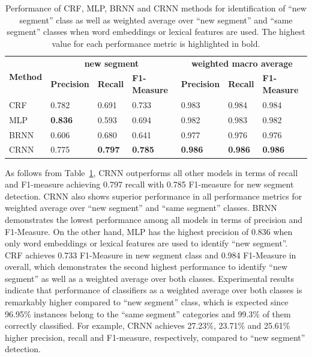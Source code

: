 \documentclass{amia}
\begin{document}
\begin{table}[ht]
\centering
\caption{Performance of CRF, MLP, BRNN and CRNN methods for identification of ``new segment'' class as well as weighted average over ``new segment'' and ``same segment'' classes when word embeddings or lexical features are used. The highest value for each performance metric
is highlighted in bold.}
\label{tab:result_base}
  \begin{tabular}{|l|l|l|l|l|l|l|}
  \hline
   \multirow{2}{*}{\textbf{Method}} & \multicolumn{3}{|c|}{\textbf{new segment}} & \multicolumn{3}{|c|}{\textbf{weighted macro average}} \\\cline{2-7}
   & \textbf{Precision}  & \textbf{Recall} & \textbf{F1-Measure} & \textbf{Precision}  & \textbf{Recall} & \textbf{F1-Measure} \\ \hline    
 CRF & 0.782 & 0.691 & 0.733 & 0.983 & 0.984 & 0.984 \\ \hline
 MLP & \textbf{0.836} & 0.593 & 0.694 & 0.982 & 0.983 & 0.982 \\ \hline
 BRNN & 0.606 & 0.680 & 0.641 & 0.977 & 0.976 & 0.976 \\ \hline
 CRNN & 0.775 & \textbf{0.797} & \textbf{0.785} & \textbf{0.986} & \textbf{0.986} & \textbf{0.986} \\ \hline
  \end{tabular}
\end{table}                         

As follows from Table~\ref{tab:result_base}, CRNN outperforms all other models in terms of recall and F1-measure achieving 0.797 recall with 0.785 F1-measure for new segment detection. CRNN also shows superior performance in all performance metrics for weighted average over ``new segment'' and ``same segment'' classes. BRNN demonstrates the lowest performance among all models in terms of precision and F1-Measure. On the other hand, MLP has the highest precision of 0.836 when only word embeddings or lexical features are used to identify ``new segment''. CRF achieves 0.733 F1-Measure in new segment class and 0.984 F1-Measure in overall, which demonstrates the second highest performance to identify ``new segment'' as well as a weighted average over both classes. Experimental results indicate that performance of classifiers as a weighted average over both classes is remarkably higher compared to ``new segment'' class, which is expected since 96.95\% instances belong to the ``same segment'' categories and 99.3\% of them correctly classified. For example, CRNN achieves 27.23\%, 23.71\% and 25.61\% higher precision, recall and F1-measure, respectively, compared to ``new segment'' detection. 
\end{document}
